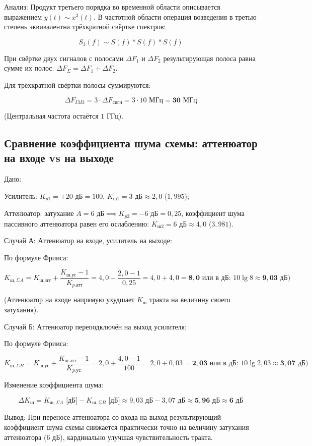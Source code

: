 Анализ: Продукт третьего порядка во временной области описывается выражением $y(t) \sim x^3(t)$. В частотной области операция возведения в третью степень эквивалентна трёхкратной свёртке спектров:

$$S_3(f) \sim S(f) * S(f) * S(f)$$

При свёртке двух сигналов с полосами $\Delta F_1$ и $\Delta F_2$ результирующая полоса равна сумме их полос: $\Delta F_{\Sigma} = \Delta F_1 + \Delta F_2$.

Для трёхкратной свёртки полосы суммируются:

$$\Delta F_{IM3} = 3 \cdot \Delta F_{\text{сигн}} = 3 \cdot 10\text{ МГц} = \mathbf{30\text{ МГц}}$$

(Центральная частота остаётся $1\text{ ГГц}$).

\subsection* {Сравнение коэффициента шума схемы: аттенюатор на входе vs на выходе}

Дано:

Усилитель: $K_{p1} = +20\text{ дБ} = 100$, $K_{\text{ш1}} = 3\text{ дБ} \approx 2{,}0$ ($1{,}995$);

Аттенюатор: затухание $A = 6\text{ дБ} \implies K_{p2} = -6\text{ дБ} = 0{,}25$, коэффициент шума пассивного аттенюатора равен его ослаблению: $K_{\text{ш2}} = 6\text{ дБ} \approx 4{,}0$ ($3{,}981$).

Случай А: Аттенюатор на входе, усилитель на выходе:

По формуле Фрииса:

$$K_{\text{ш},\Sigma A} = K_{\text{ш.атт}} + \frac{K_{\text{ш.ус}} - 1}{K_{p.\text{атт}}} = 4{,}0 + \frac{2{,}0 - 1}{0{,}25} = 4{,}0 + 4{,}0 = \mathbf{8{,}0}\text{ или в дБ: } 10\lg 8 \approx \mathbf{9{,}03\text{ дБ}})$$

(Аттенюатор на входе напрямую ухудшает $K_{\text{ш}}$ тракта на величину своего затухания).

Случай Б: Аттенюатор переподключён на выход усилителя:

По формуле Фрииса:

$$K_{\text{ш},\Sigma B} = K_{\text{ш.ус}} + \frac{K_{\text{ш.атт}} - 1}{K_{p.\text{ус}}} = 2{,}0 + \frac{4{,}0 - 1}{100} = 2{,}0 + 0{,}03 = \mathbf{2{,}03}\text{ или в дБ: } 10\lg 2{,}03 \approx \mathbf{3{,}07\text{ дБ}})$$

Изменение коэффициента шума:

$$\Delta K_{\text{ш}} = K_{\text{ш},\Sigma A}\text{ [дБ]} - K_{\text{ш},\Sigma B}\text{ [дБ]} \approx 9{,}03\text{ дБ} - 3{,}07\text{ дБ} \approx \mathbf{5{,}96\text{ дБ}} \approx \mathbf{6\text{ дБ}}$$

Вывод: При переносе аттенюатора со входа на выход результирующий коэффициент шума схемы снижается практически точно на величину затухания аттенюатора ($6\text{ дБ}$), кардинально улучшая чувствительность тракта.